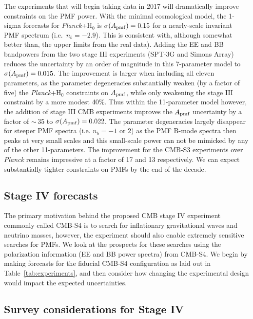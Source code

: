 \documentclass[apj]{emulateapj}
\newcommand{\apmf}{\ensuremath{A_{\rm pmf}}}
\newcommand{\ho}{H\ensuremath{_0}}
\newcommand{\planck}{{\sl Planck}}
\newcommand{\sptnew}{SPT-3G}
\newcommand{\simons}{Simons Array}
\begin{document}
The experiments that will begin taking data in 2017 will dramatically improve constraints on the PMF power. 
With the minimal cosmological model, the 1-sigma forecasts for \planck{}+\ho{} is $\sigma(\apmf)=\fisherAplk$ for a nearly-scale invariant PMF spectrum (i.e.~$n_b=-2.9$). 
This is consistent with, although somewhat better than, the upper limits from the real data).  
Adding the EE and BB bandpowers from the two stage III experiments (\sptnew{} and \simons{}) reduces the uncertainty by an order of magnitude in this 7-parameter model to $\sigma(\apmf)=0.015$. 
The improvement is larger when including all eleven parameters, as the parameter degeneracies substantially weaken (by a factor of five) the \planck+\ho{} constraints on \apmf{}, while only weakening the stage III constraint by a  more modest 40\%. 
Thus within the 11-parameter model however,  the addition of stage III CMB experiments improves the \apmf{} uncertainty by a factor of $\sim$\,35 to  $\sigma(\apmf)=0.022$. 
The parameter degeneracies largely disappear for steeper PMF spectra (i.e. $n_b=-1$ or 2) as the PMF B-mode spectra then peaks at very small scales and this small-scale power can not be mimicked by any of the other 11-parameters. 
The improvement for the CMB-S3 experiments over \planck{} remains impressive at a factor of 17 and 13 respectively. 
We can expect substantially tighter constraints on PMFs by the end of the decade. 

\subsection{Stage IV forecasts}

The primary motivation behind the proposed CMB stage IV experiment commonly called CMB-S4 is to search for inflationary gravitational waves and neutrino masses, however, the experiment should also enable extremely sensitive searches for PMFs. 
We look at the prospects for these searches using the polarization information (EE and BB power spectra) from CMB-S4. 
We begin by making forecasts for the fiducial CMB-S4 configuration as laid out in Table~\ref{tab:experiments}, and then consider how changing the experimental design would impact the expected uncertainties. 




\subsection{Survey considerations for Stage IV}
\end{document}
